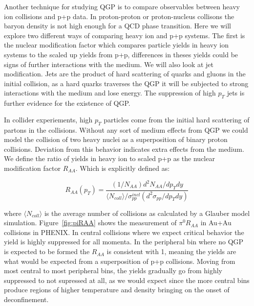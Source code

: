 Another technique for studying QGP is to compare observables between heavy ion collisions and p+p data. In proton-proton or proton-nucleus collisons the baryon density is not high enough for a QCD phase transition. Here we will explore two different ways of comparing heavy ion and p+p systems. The first is the nuclear modification factor which compares particle yields in  heavy ion systems to the scaled up yields from p+p, differences in theses yields could be signs of further interactions with the medium. We will also look at jet modification. Jets are the product of hard scattering of quarks and gluons in the initial collision, as a hard quarks traverses the QGP it will be subjected to strong interactions with the medium and lose energy. The suppression of high $p_T$ jets is further evidence for the existence of QGP.

In collider experiements, high $p_T$ particles come from the initial hard scattering of partons in the collisions. Without any sort of medium effects from QGP we could model the collision of two heavy nuclei as a superposition of binary proton collisions. Deviation from this behavior indicates extra effects from the medium. We define the ratio of yields in heavy ion to scaled p+p as the nuclear modification factor $R_{AA}$. Which is explicitly defined as:

\begin{equation}\label{eq:RAAdef}
R_{AA}(p_T) = \frac{(1/N_{AA}) d^2N_{AA}/dp_Tdy}{\langle N_{coll} \rangle/\sigma^{incl}_{pp}(d^2\sigma_{pp}/dp_Tdy)} 
\end{equation}

where $ \langle N_{coll} \rangle $ is the average number of collisions as calculated by a Glauber model simulation. Figure~\ref{fig:piRAA} shows the measurement of $\pi^0 R_{AA}$ in Au+Au collisions in PHENIX. In central collisions where we expect critical behavior the yield is highly suppressed for all momenta. In the peripheral bin where no QGP is expected to be formed the $R_{AA}$ is consistent with 1, meaning the yields are what would be expected from a superposition of p+p collisions. Moving from most central to most peripheral bins, the yields gradually go from highly suppressed to not supressed at all, as we would expect since the more central bins produce regions of higher temperature and density bringing on the onset of deconfinement.

